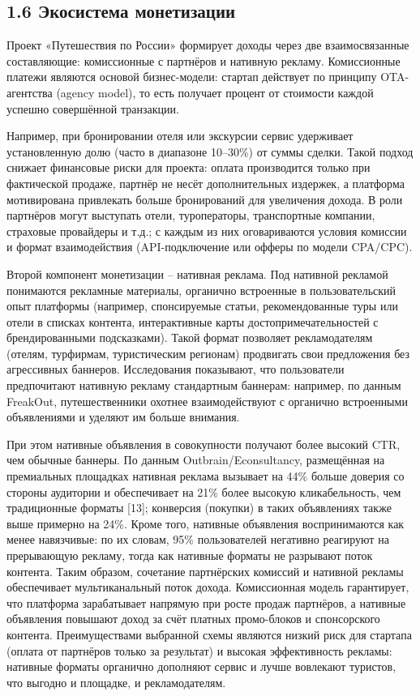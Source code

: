 \subsection*{1.6 Экосистема монетизации}
Проект «Путешествия по России» формирует доходы через две взаимосвязанные составляющие: комиссионные с партнёров и нативную рекламу. Комиссионные платежи являются основой бизнес-модели: стартап действует по принципу OTA-агентства (agency model), то есть получает процент от стоимости каждой успешно совершённой транзакции. 

Например, при бронировании отеля или экскурсии сервис удерживает установленную долю (часто в диапазоне 10–30\%) от суммы сделки. Такой подход снижает финансовые риски для проекта: оплата производится только при фактической продаже, партнёр не несёт дополнительных издержек, а платформа мотивирована привлекать больше бронирований для увеличения дохода. В роли партнёров могут выступать отели, туроператоры, транспортные компании, страховые провайдеры и т.д.; с каждым из них оговариваются условия комиссии и формат взаимодействия (API-подключение или офферы по модели CPA/CPC).

Второй компонент монетизации – нативная реклама. Под нативной рекламой понимаются рекламные материалы, органично встроенные в пользовательский опыт платформы (например, спонсируемые статьи, рекомендованные туры или отели в списках контента, интерактивные карты достопримечательностей с брендированными подсказками). Такой формат позволяет рекламодателям (отелям, турфирмам, туристическим регионам) продвигать свои предложения без агрессивных баннеров. Исследования показывают, что пользователи предпочитают нативную рекламу стандартным баннерам: например, по данным FreakOut, путешественники охотнее взаимодействуют с органично встроенными объявлениями и уделяют им больше внимания. 

При этом нативные объявления в совокупности получают более высокий CTR, чем обычные баннеры. По данным Outbrain/Econsultancy, размещённая на премиальных площадках нативная реклама вызывает на 44\% больше доверия со стороны аудитории и обеспечивает на 21\% более высокую кликабельность, чем традиционные форматы [13]; конверсия (покупки) в таких объявлениях также выше примерно на 24\%. Кроме того, нативные объявления воспринимаются как менее навязчивые: по их словам, 95\% пользователей негативно реагируют на прерывающую рекламу, тогда как нативные форматы не разрывают поток контента. Таким образом, сочетание партнёрских комиссий и нативной рекламы обеспечивает мультиканальный поток дохода. Комиссионная модель гарантирует, что платформа зарабатывает напрямую при росте продаж партнёров, а нативные объявления повышают доход за счёт платных промо-блоков и спонсорского контента. Преимуществами выбранной схемы являются низкий риск для стартапа (оплата от партнёров только за результат) и высокая эффективность рекламы: нативные форматы органично дополняют сервис и лучше вовлекают туристов, что выгодно и площадке, и рекламодателям.

